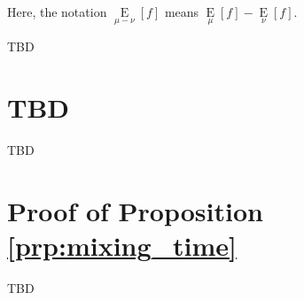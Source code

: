 \documentclass[anon,12pt]{colt2018} %
\newcommand{\AB}[1]{\left[#1\right]}
\newcommand{\Ea}[2]{\underset{#1}{\operatorname{E}}\AB{#2}}
\begin{document}
Here, the notation $\Ea{\mu-\nu}{f}$ means $\Ea{\mu}{f}-\Ea{\nu}{f}$.

TBD






\appendix

\section{TBD}

TBD

\section{Proof of Proposition \ref{prp:mixing_time}}
\label{sec:proof__prp__mixing_time}

TBD
\end{document}
